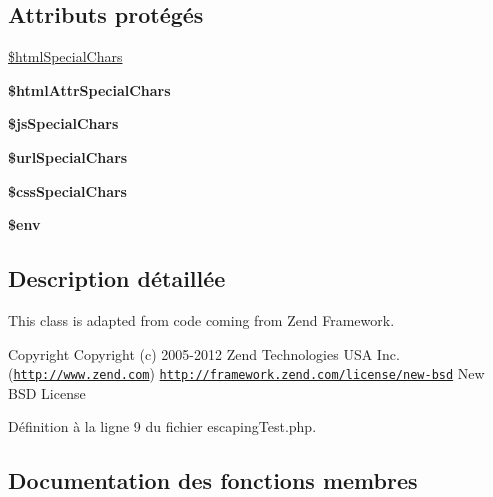 \subsection*{Attributs protégés}
\begin{DoxyCompactItemize}
\item 
\hyperlink{class_twig___test___escaping_test_aa011690d819be6f19abf849bb8fe8e7d}{\$html\+Special\+Chars}
\item 
{\bfseries \$html\+Attr\+Special\+Chars}
\item 
{\bfseries \$js\+Special\+Chars}
\item 
{\bfseries \$url\+Special\+Chars}\hypertarget{class_twig___test___escaping_test_a26bb23a6b72fa6dcafed884c43b35572}{}\label{class_twig___test___escaping_test_a26bb23a6b72fa6dcafed884c43b35572}

\item 
{\bfseries \$css\+Special\+Chars}
\item 
{\bfseries \$env}\hypertarget{class_twig___test___escaping_test_aa99ce9ae015e958eef5782267276fbb4}{}\label{class_twig___test___escaping_test_aa99ce9ae015e958eef5782267276fbb4}

\end{DoxyCompactItemize}


\subsection{Description détaillée}
This class is adapted from code coming from Zend Framework.

\begin{DoxyCopyright}{Copyright}
Copyright (c) 2005-\/2012 Zend Technologies U\+SA Inc. (\href{http://www.zend.com}{\tt http\+://www.\+zend.\+com})  \href{http://framework.zend.com/license/new-bsd}{\tt http\+://framework.\+zend.\+com/license/new-\/bsd} New B\+SD License 
\end{DoxyCopyright}


Définition à la ligne 9 du fichier escaping\+Test.\+php.



\subsection{Documentation des fonctions membres}
